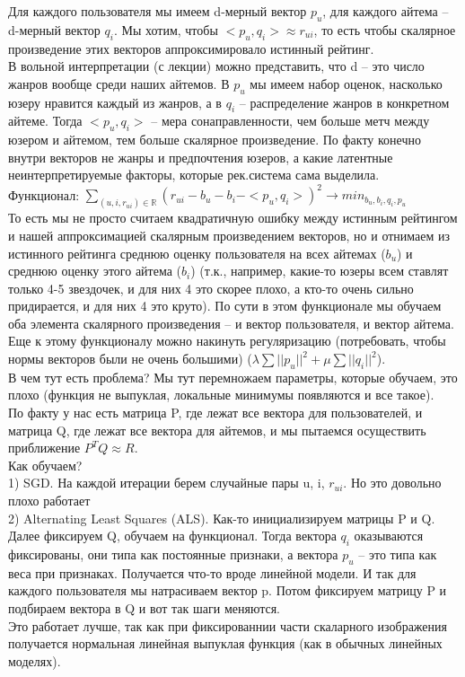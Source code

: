 Для каждого пользователя мы имеем d-мерный вектор $p_{u}$, для каждого айтема -- d-мерный вектор $q_{i}$. Мы хотим, чтобы $<p_{u}, q_{i}> \approx r_{ui}$, то есть чтобы скалярное произведение этих векторов аппроксимировало истинный рейтинг. \\ 

В вольной интерпретации (с лекции) можно представить, что d -- это число жанров вообще среди наших айтемов. В $p_{u}$ мы имеем набор оценок, насколько юзеру нравится каждый из жанров, а в $q_{i}$ -- распределение жанров в конкретном айтеме. Тогда $<p_{u}, q_{i}>$ -- мера сонаправленности, чем больше метч между юзером и айтемом, тем больше скалярное произведение. По факту конечно внутри векторов не жанры и предпочтения юзеров, а какие латентные неинтерпретируемые факторы, которые рек.система сама выделила. \\ 

Функционал: $\sum\limits_{(u, i, r_{ui}) \in \mathbb{R}}(r_{ui} - b_{u} - b_{i} - <p_{u}, q_{i}>)^{2} \rightarrow min_{b_{u}, b_{i}, q_{i}, p_{u}}$  \\ 

То есть мы не просто считаем квадратичную ошибку между истинным рейтингом и нашей аппроксимацией скалярным произведением векторов, но и отнимаем из истинного рейтинга среднюю оценку пользователя на всех айтемах ($b_{u}$) и среднюю оценку этого айтема ($b_{i}$) (т.к., например, какие-то юзеры всем ставлят только 4-5 звездочек, и для них 4 это скорее плохо, а кто-то очень сильно придирается, и для них 4 это круто). По сути в этом функционале мы обучаем оба элемента скалярного произведения -- и вектор пользователя, и вектор айтема. Еще к этому функционалу можно накинуть регуляризацию (потребовать, чтобы нормы векторов были не очень большими) ($\lambda\sum||p_{u}||^{2} + \mu\sum||q_{i}||^{2}$).  \\ 

В чем тут есть проблема? Мы тут перемножаем параметры, которые обучаем, это плохо (функция не выпуклая, локальные минимумы появляются и все такое). \\ 

По факту у нас есть матрица P, где лежат все вектора для пользователей, и матрица Q, где лежат все вектора для айтемов, и мы пытаемся осуществить приближение $P^{T}Q \approx R$. \\ 

Как обучаем? \\ 
1) SGD. На каждой итерации берем случайные пары u, i, $r_{ui}$. Но это довольно плохо работает \\ 
2) Alternating Least Squares (ALS). Как-то инициализируем матрицы P и Q. Далее фиксируем Q, обучаем на функционал. Тогда вектора $q_{i}$ оказываются фиксированы, они типа как постоянные признаки, а вектора $p_{u}$ -- это типа как веса при признаках. Получается что-то вроде линейной модели. И так для каждого пользователя мы натрасиваем вектор p. Потом фиксируем матрицу P и подбираем вектора в Q и вот так шаги меняются. \\ 
Это работает лучше, так как при фиксированнии части скаларного изображения получается нормальная линейная выпуклая функция (как в обычных линейных моделях). \\ 


